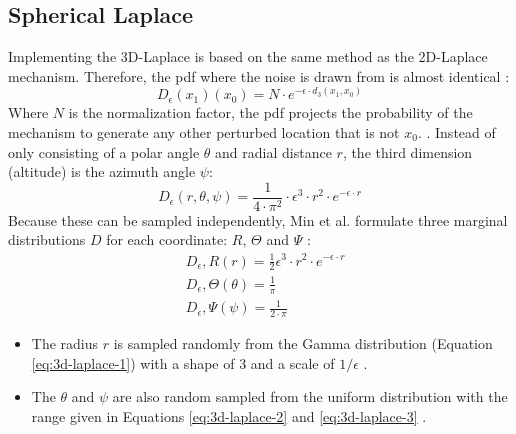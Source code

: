 \subsection{Spherical Laplace}
Implementing the 3D-Laplace is based on the same method as the 2D-Laplace mechanism.
Therefore, the \gls{pdf} where the noise is drawn from is almost identical \citep{9646489}:
\begin{equation}
  D_{\epsilon}(x_1)(x_0) = N \cdot e^{-\epsilon \cdot d_3(x_1, x_0)}
  \label{eq:3d-laplace-pdf}
\end{equation}
Where $N$ is the normalization factor, the \gls{pdf} projects the probability of the mechanism to generate any other perturbed location that is not $x_0$. \citep{9646489}.
Instead of only consisting of a polar angle $\theta$ and radial distance $r$, the third dimension (altitude) is the azimuth angle $\psi$:
\begin{equation}
  D_{\epsilon}(r, \theta, \psi) = \frac{1}{4 \cdot \pi^2} \cdot \epsilon^3 \cdot r^2 \cdot e^{-\epsilon \cdot r}
  \label{eq:3d-laplace-with-normalization}
\end{equation}
Because these can be sampled independently, Min et al. formulate three marginal distributions $D$ for each coordinate: $R$, $\Theta$ and $\Psi$ \citep{9646489}:
\begin{subequations}
  \begin{align}
     & D_\epsilon, R(r) = \frac{1}{2} \epsilon^3 \cdot r^2 \cdot e^{-\epsilon \cdot r} \label{eq:3d-laplace-1} \\
     & D_\epsilon, \Theta(\theta) = \frac{1}{\pi}                                      \label{eq:3d-laplace-2} \\
     & D_\epsilon, \Psi(\psi) = \frac{1}{2 \cdot \pi} \label{eq:3d-laplace-3}
  \end{align}
\end{subequations}
\begin{itemize}
  \item The radius $r$ is sampled randomly from the Gamma distribution (Equation \ref{eq:3d-laplace-1}) with a shape of 3 and a scale of $1/\epsilon$ \citep{9646489}.
  \item The $\theta$ and $\psi$ are also random sampled from the uniform distribution with the range given in Equations \ref{eq:3d-laplace-2} and \ref{eq:3d-laplace-3} \citep{9646489}.
\end{itemize}
